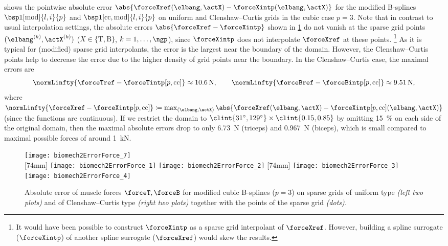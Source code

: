 \vspace{\fill}

 shows the pointwise absolute error
$\abs{\forceXref(\elbang, \actX) - \forceXintp(\elbang, \actX)}$
for the modified B-splines $\bspl[\modified]{l,i}{p}$ and
$\bspl[\cc,\modified]{l,i}{p}$
on uniform and Clenshaw--Curtis grids in the cubic case $p = 3$.
Note that in contrast to usual interpolation settings,
the absolute errors $\abs{\forceXref - \forceXintp}$
shown in \cref{fig:biomech2ErrorForce} do not vanish at the
sparse grid points $(\elbang^{(k)}, \actX^{(k)})$
($X \in \{\mathrm{T}, \mathrm{B}\}$, $k = 1, \dotsc, \ngp$),
since $\forceXintp$ does not interpolate $\forceXref$
at these points.%
\footnote{%
  It would have been possible to construct $\forceXintp$
  as a sparse grid interpolant of $\forceXref$.
  However, building a spline surrogate ($\forceXintp$)
  of another spline surrogate ($\forceXref$) would skew the results.%
}
As it is typical for (modified) sparse grid interpolants,
the error is the largest near the boundary of the domain.
However, the Clenshaw--Curtis points help to decrease the error
due to the higher density of grid points near the boundary.
In the Clenshaw--Curtis case, the maximal errors are
\begin{equation}
  \normLinfty{\forceTref - \forceTintp[p,\cc]}
  \approx \SI{10.6}{\newton},\qquad
  \normLinfty{\forceBref - \forceBintp[p,\cc]}
  \approx \SI{9.51}{\newton},
\end{equation}
where $\normLinfty{\forceXref - \forceXintp[p,\cc]}
\ceq \max_{(\elbang, \actX)}
\abs{\forceXref(\elbang, \actX) - \forceXintp[p,\cc](\elbang, \actX)}$
(since the functions are continuous).
If we restrict the domain to
$\clint{\ang{31}, \ang{129}} \times \clint{0.15, 0.85}$
by omitting \SI{15}{\percent} on each side of the original domain,
then the maximal absolute errors drop to only
\SI{6.73}{\newton} (triceps) and \SI{0.967}{\newton} (biceps),
which is small compared to maximal possible forces of
around \SI{1}{\kilo\newton}.

\begin{figure}
  \texttt{[image: biomech2ErrorForce\_7]}%
  \\[2mm]%
  [74mm]{%
    \texttt{[image: biomech2ErrorForce\_1]}%
    \hfill%
    \texttt{[image: biomech2ErrorForce\_2]}%
  }%
  \hfill%
  [74mm]{%
    \texttt{[image: biomech2ErrorForce\_3]}%
    \hfill%
    \texttt{[image: biomech2ErrorForce\_4]}%
  }%
  \caption[Absolute error of muscle forces]{%
    Absolute error of muscle forces $\forceT, \forceB$ for
    modified cubic B-splines ($p = 3$)
    on sparse grids of uniform type \emph{(left two plots)} and
    of Clenshaw--Curtis type \emph{(right two plots)}
    together with the points of the sparse grid \emph{(dots).}%
  }%
  \label{fig:biomech2ErrorForce}%
\end{figure}

